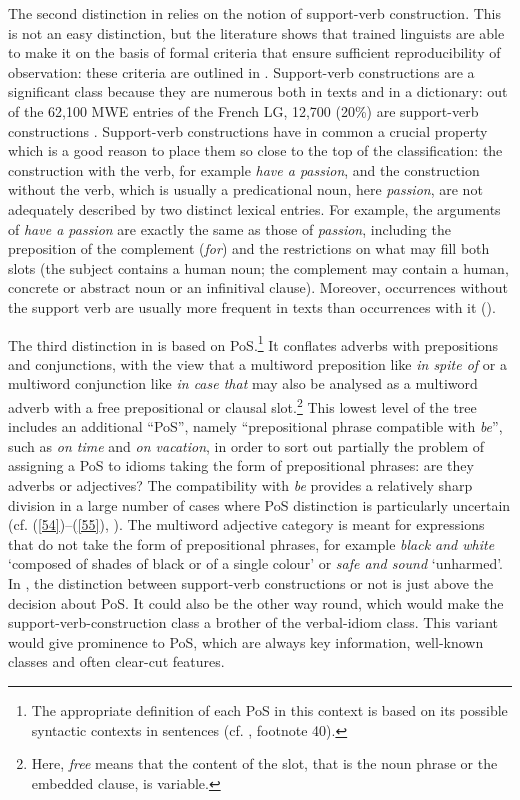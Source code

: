 \documentclass[output=paper]{langsci/langscibook}
\begin{document}
The second distinction in  relies on the notion of support-verb construction. This is not an easy distinction, but the literature shows that trained linguists are able to make it on the basis of formal criteria that ensure sufficient  reproducibility of observation: these criteria are outlined in . Support-verb constructions 
are a significant class because they are numerous both in texts and in a dictionary: 
out of the 62,100 MWE entries of the French LG, 12,700 (20\%) are support-verb constructions \citep{Tolone2011}. Support-verb constructions have in common a crucial property which is a good reason to place them so close to the top of the classification: the construction with the verb, for example \textit{have a passion}, and the construction without the verb, which is usually a predicational noun, here \textit{passion}, are not adequately described by two distinct lexical entries. For example, the arguments of \textit{have a passion} are exactly the same as those of \textit{passion}, including the preposition of the complement (\textit{for}) and the restrictions on what may fill both slots (the subject contains a human noun; the complement may contain a human, concrete or abstract noun or an infinitival clause). Moreover, occurrences without the support verb are usually more frequent in texts than occurrences with it (\citealt{Laporte2008}).

The third distinction in  is based on PoS.\footnote{The appropriate definition of each PoS in this context is based on its possible syntactic contexts in sentences (cf. , footnote 40).} It conflates adverbs with prepositions and conjunctions, with the view that a multiword preposition like \textit{in spite of} or a multiword conjunction like \textit{in case that} may also be analysed as a multiword adverb with a free prepositional or clausal slot.\footnote{Here, \textit{free} means that the content of the slot, that is the noun phrase or the embedded clause, is variable.} This lowest level of the tree includes an additional “PoS”, namely ``prepositional phrase compatible with \textit{be}'', such as \textit{on time} and \textit{on vacation}, in order to sort out partially the problem of assigning a PoS to idioms taking the form of prepositional phrases: are they adverbs or adjectives? The compatibility with \textit{be} provides a relatively sharp division in a large number of cases where PoS distinction is particularly uncertain (cf. (\ref{54})--(\ref{55}), ). The multiword adjective category is meant for expressions that do not take the form of prepositional phrases, for example \textit{black and white} ‘composed of shades of black or of a single colour’ or \textit{safe and sound} ‘unharmed’. In , the distinction between support-verb constructions or not is just above the decision about PoS. It could also be the other way round, which would make the support-verb-construction class a brother of the verbal-idiom class. This variant would give prominence to PoS, which are always key information, well-known classes and often clear-cut features.
\end{document}
